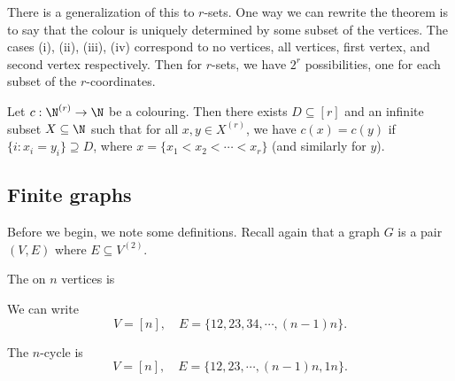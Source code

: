 \documentclass[a4paper]{article}
\begin{document}
There is a generalization of this to $r$-sets. One way we can rewrite the theorem is to say that the colour is uniquely determined by some subset of the vertices. The cases (i), (ii), (iii), (iv) correspond to no vertices, all vertices, first vertex, and second vertex respectively. Then for $r$-sets, we have $2^r$ possibilities, one for each subset of the $r$-coordinates.

\begin{thm}
  Let $c: \N^{(r)} \to \N$ be a colouring. Then there exists $D \subseteq [r]$ and an infinite subset $X \subseteq \N$ such that for all $x, y \in X^{(r)}$, we have $c(x) = c(y)$ if $\{i: x_i = y_i\} \supseteq D$, where $x = \{x_1 < x_2 < \cdots < x_r\}$ (and similarly for $y$).
\end{thm}

\subsection{Finite graphs}
Before we begin, we note some definitions. Recall again that a graph $G$ is a pair $(V, E)$ where $E \subseteq V^{(2)}$.
\begin{eg}
  The  on $n$ vertices  is
  \begin{center}
  \end{center}
  We can write
  \[
    V = [n],\quad E = \{12, 23, 34, \cdots, (n-1)n\}.
  \]
\end{eg}

\begin{eg}
  The $n$-cycle  is
  \[
    V = [n],\quad E = \{12, 23, \cdots, (n-1)n, 1n\}.
  \]
  \begin{center}
  \end{center}
\end{eg}
\end{document}
